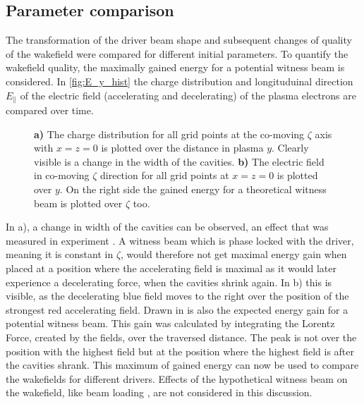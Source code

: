 \documentclass[bachelor_thesis]{subfiles}
\begin{document}
\subsection{Parameter comparison}
The transformation of the driver beam shape and subsequent changes of quality of the wakefield were compared for different initial parameters. To quantify the wakefield quality, the maximally gained energy 
for a potential witness beam is considered. In \autoref{fig:E_y_hist} the charge distribution and longituduinal direction $E_{\parallel}$ of the electric field (accelerating and decelerating) of the plasma electrons are compared over time. 
\begin{figure}
	\centering
	
	\caption{
	\textbf{a)} The charge distribution for all grid points at the co-moving $\zeta$ axis with $x=z=0$ is plotted over the distance in plasma $y$. Clearly visible is a change in the width of the cavities.
	\textbf{b)} The electric field in co-moving $\zeta$ direction for all grid points at $x=z=0$ is plotted over $y$. On the right side the gained energy for a theoretical
	witness beam is plotted over $\zeta$ too.}
	\label{fig:E_y_hist}
\end{figure}

In a), a change in width of the cavities can be observed, an effect that was measured in experiment \cite{Schoebel2022}. A witness beam which is phase locked with the driver, meaning it is constant in $\zeta$,
would therefore not get maximal energy gain when placed at a position where the accelerating field is maximal as it would later experience a decelerating force, when the cavities shrink again.
In b) this is visible, as the decelerating blue field moves to the right over the position of the strongest red accelerating field. Drawn in is also the expected energy gain for a potential witness beam.
This gain was calculated by integrating the Lorentz Force, created by the fields, over the traversed distance. The peak is not over the position with the highest field but at the position where the highest field is after the cavities shrank.
This maximum of gained energy can now be used to compare the wakefields for different drivers. Effects of the hypothetical witness beam on the wakefield, like beam loading \cite{Kirchen2021, Goetzfried2020}, are not considered in this discussion.
\end{document}
